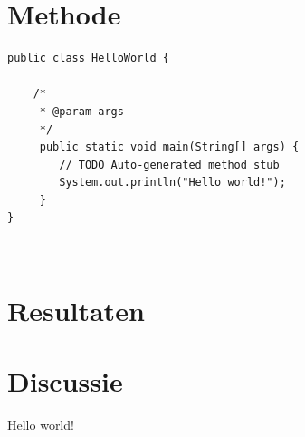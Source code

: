 \documentclass[12pt]{article}
\begin{document}
\section{Methode}

\begin{lstlisting}
public class HelloWorld {

	/*
	 * @param args
	 */
	 public static void main(String[] args) {
	 	// TODO Auto-generated method stub
	 	System.out.println("Hello world!");
	 }
}
\end{lstlisting}
\\

\section{Resultaten}

\section{Discussie}

Hello world!
\end{document}
